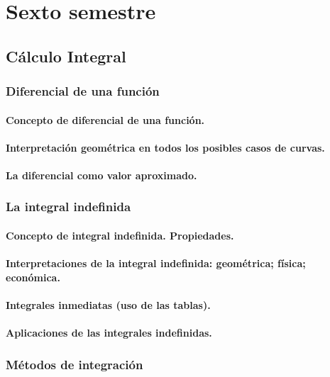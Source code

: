 \part{Sexto semestre}
\chapter{Cálculo Integral}


\section{Diferencial de una función} %
\subsection{Concepto de diferencial de una función.}
\subsection{Interpretación geométrica en todos los posibles casos de curvas.}
\subsection{La diferencial como valor aproximado.}



\section{La integral indefinida} %
\subsection{Concepto de integral indefinida. Propiedades.}
\subsection{Interpretaciones de la integral indefinida: geométrica; física; económica.}
\subsection{Integrales inmediatas (uso de las tablas).}
\subsection{Aplicaciones de las integrales indefinidas.}



\section{Métodos de integración} %
